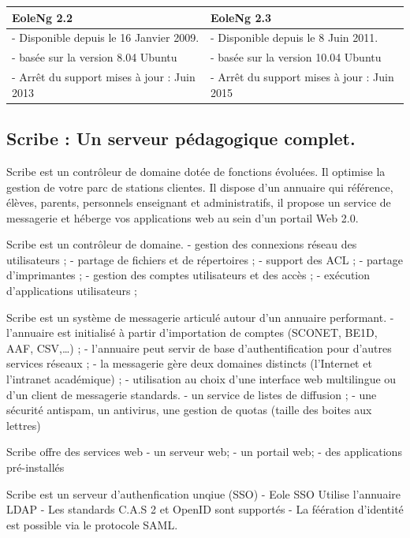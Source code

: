 \documentclass{article}
\begin{document}
\begin{center}
\begin{tabular}{ll}
EoleNg 2.2 & EoleNg 2.3\\
\hline
- Disponible depuis le 16 Janvier 2009. & - Disponible depuis le 8 Juin
2011.\\
- basée sur la version 8.04 Ubuntu & - basée sur la version 10.04
Ubuntu\\
- Arrêt du support mises à jour : Juin 2013 & - Arrêt du support mises à
jour : Juin 2015\\
\end{tabular}
\end{center}

\subsection{Scribe : Un serveur pédagogique complet.}

Scribe est un contrôleur de domaine dotée de fonctions évoluées. Il
optimise la gestion de votre parc de stations clientes. Il dispose d'un
annuaire qui référence, élèves, parents, personnels enseignant et
administratifs, il propose un service de messagerie et héberge vos
applications web au sein d'un portail Web 2.0.

Scribe est un contrôleur de domaine. - gestion des connexions réseau des
utilisateurs ; - partage de fichiers et de répertoires ; - support des
ACL ; - partage d'imprimantes ; - gestion des comptes utilisateurs et
des accès ; - exécution d'applications utilisateurs ;

Scribe est un système de messagerie articulé autour d'un annuaire
performant. - l'annuaire est initialisé à partir d'importation de
comptes (SCONET, BE1D, AAF, CSV,\ldots{}) ; - l'annuaire peut servir de
base d'authentification pour d'autres services réseaux ; - la messagerie
gère deux domaines distincts (l'Internet et l'intranet académique) ; -
utilisation au choix d'une interface web multilingue ou d'un client de
messagerie standards. - un service de listes de diffusion ; - une
sécurité anti­spam, un anti­virus, une gestion de quotas (taille des
boites aux lettres)

Scribe offre des services web - un serveur web; - un portail web; - des
applications pré-installés

Scribe est un serveur d'authenfication unqiue (SSO) - Eole SSO Utilise
l'annuaire LDAP - Les standards C.A.S 2 et OpenID sont supportés - La
féération d'identité est possible via le protocole SAML.
\end{document}
